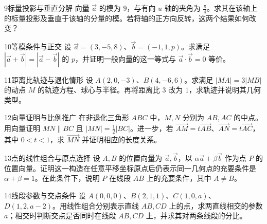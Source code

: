 \begin{exercise}{9}{标量投影与垂直分解}
向量 $\vec a$ 的模为 $9$，与有向 $u$ 轴的夹角为 $\frac\pi4$。求其在该轴上的标量投影及垂直于该轴的分量的模。若将轴的正方向反转，这两个结果如何改变？
\end{exercise}
\begin{exercise}{10}{等模条件与正交}
设 $\vec a=(3,-5,8)$、$\vec b=(-1,1,p)$。求满足 $|\vec a+\vec b|=|\vec a-\vec b|$ 的 $p$，并证明一般向量的这一等式与 $\vec a\cdot\vec b=0$ 等价。
\end{exercise}
\begin{exercise}{11}{距离比轨迹与退化情形}
设 $A(2,0,-3)$、$B(4,-6,6)$。求满足 $|MA|=3|MB|$ 的动点 $M$ 的轨迹方程、球心与半径。再将距离比 $3$ 改为 $1$，求轨迹并说明其几何类型。
\end{exercise}
\begin{exercise}{12}{向量证明与比例推广}
在非退化三角形 $ABC$ 中，$M,N$ 分别为 $AB,AC$ 的中点。用向量证明 $MN\parallel BC$ 且 $|MN|=\frac12|BC|$。进一步，若 $\overrightarrow{AM}=t\overrightarrow{AB}$、$\overrightarrow{AN}=t\overrightarrow{AC}$，其中 $0<t<1$，求 $\overrightarrow{MN}$ 并证明相应的长度关系。
\end{exercise}
\begin{exercise}{13}{点的线性组合与原点选择}
设 $A,B$ 的位置向量为 $\vec a,\vec b$，以 $\alpha\vec a+\beta\vec b$ 作为点 $P$ 的位置向量。证明这一构造在任意平移坐标原点后仍表示同一几何点的充要条件是 $\alpha+\beta=1$。在此条件下，说明 $P$ 在线段 $AB$ 上的充要条件，其中 $A\ne B$。
\end{exercise}
\begin{exercise}{14}{线段参数与交点条件}
设 $A(0,0,0)$、$B(2,1,1)$、$C(1,0,a)$、$D(1,2,a-2)$。用线性组合分别表示直线 $AB,CD$ 上的点，求两直线相交的参数 $a$；相交时判断交点是否同时在线段 $AB,CD$ 上，并求其对两条线段的分比。
\end{exercise}
